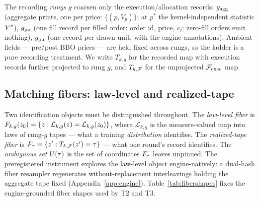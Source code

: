 The recording \emph{rungs} $g$ coarsen only the execution/allocation records:
$g_{\mathrm{agg}}$ (aggregate prints, one per price: $\{(p, V_p)\}$; at $p^{*}$ the
kernel-independent statistic $V^{*}$), $g_{\mathrm{po}}$ (one fill record per filled
order: order id, price, $c_i$; zero-fill orders emit nothing), $g_{\mathrm{pu}}$ (one
record per drawn unit, with the engine annotations). Ambient fields ---
pre/post BBO prices --- are held fixed across rungs, so the ladder is a pure
recording treatment. We write $T_{k,g}$ for the recorded map with execution
records further projected to rung $g$, and $T_{k,\mathcal{F}}$ for the unprojected
$\mathcal{F}_{\mathrm{exec}}$ map.

\subsection{Matching fibers: law-level and realized-tape}
\label{sec:fibers}

Two identification objects must be distinguished throughout. The
\emph{law-level fiber} is
$F_{k,g}(z_0) = \{z : \mathcal{L}_{k,g}(z) =
\mathcal{L}_{k,g}(z_0)\}$, where $\mathcal{L}_{k,g}$ is the
measure-valued map into laws of rung-$g$ tapes --- what a training
\emph{distribution} identifies. The \emph{realized-tape fiber} is
$F_{\tau} = \{z' : T_{k,\mathcal{F}}(z') = \tau\}$ --- what one
round's record identifies. The \emph{ambiguous set} $U(\tau)$ is the set of
coordinates $F_{\tau}$ leaves unpinned. The preregistered instrument explores
the law-level object engine-natively: a dual-hash fiber resampler regenerates
without-replacement interleavings holding the aggregate tape fixed
(Appendix~\ref{app:engine}). Table~\ref{tab:fibershapes} fixes the
engine-grounded fiber shapes used by T2 and T3.

